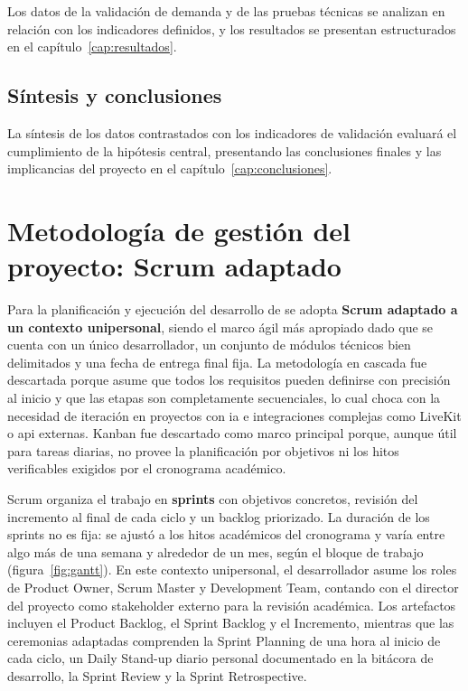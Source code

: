 Los datos de la validación de demanda y de las pruebas técnicas se
analizan en relación con los indicadores definidos, y los resultados se
presentan estructurados en el capítulo~\ref{cap:resultados}.

\subsection{Síntesis y conclusiones}

La síntesis de los datos contrastados con los indicadores de validación
evaluará el cumplimiento de la hipótesis central, presentando las
conclusiones finales y las implicancias del proyecto en el
capítulo~\ref{cap:conclusiones}.

\section{Metodología de gestión del proyecto: Scrum adaptado}

Para la planificación y ejecución del desarrollo de \sistema{} se adopta
\textbf{Scrum adaptado a un contexto unipersonal}, siendo el marco ágil
más apropiado dado que se cuenta con un único desarrollador, un conjunto
de módulos técnicos bien delimitados y una fecha de entrega final fija.
La metodología en cascada fue descartada porque asume que todos los
requisitos pueden definirse con precisión al inicio y que las etapas son
completamente secuenciales, lo cual choca con la necesidad de iteración
en proyectos con \gls{ia} e integraciones complejas como LiveKit o
\gls{api} externas. Kanban fue descartado como marco principal porque,
aunque útil para tareas diarias, no provee la planificación por
objetivos ni los hitos verificables exigidos por el cronograma
académico.

Scrum organiza el trabajo en \textbf{sprints} con objetivos concretos,
revisión del incremento al final de cada ciclo y un backlog priorizado.
La duración de los sprints no es fija: se ajustó a los hitos académicos
del cronograma y varía entre algo más de una semana y alrededor de un
mes, según el bloque de trabajo (figura~\ref{fig:gantt}). En este contexto unipersonal, el desarrollador
asume los roles de Product Owner, Scrum Master y Development Team,
contando con el director del proyecto como stakeholder externo para la
revisión académica. Los artefactos incluyen el Product Backlog, el
Sprint Backlog y el Incremento, mientras que las ceremonias adaptadas
comprenden la Sprint Planning de una hora al inicio de cada ciclo, un
Daily Stand-up diario personal documentado en la bitácora de desarrollo,
la Sprint Review y la Sprint Retrospective.

